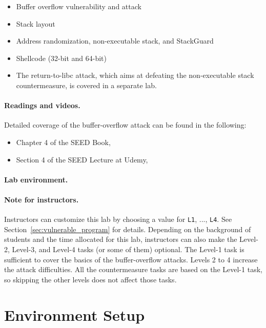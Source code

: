 \begin{itemize}[noitemsep]
\item Buffer overflow vulnerability and attack
\item Stack layout 
\item Address randomization, non-executable stack, and StackGuard
\item Shellcode (32-bit and 64-bit)
\item The return-to-libc attack, which aims at 
defeating the non-executable stack countermeasure, is covered 
in a separate lab.
\end{itemize}


\paragraph{Readings and videos.}
Detailed coverage of the buffer-overflow attack can be found in the following:

\begin{itemize}
\item Chapter 4 of the SEED Book, \seedbook
\item Section 4 of the SEED Lecture at Udemy, \seedcsvideo
\end{itemize}


\paragraph{Lab environment.} 
\seedenvironmentC


\paragraph{Note for instructors.} 
Instructors can customize this lab by choosing a value
for \texttt{L1}, ..., \texttt{L4}. See    
Section~\ref{sec:vulnerable_program} for details.
Depending on the background of students and the time allocated 
for this lab, instructors can also make the 
Level-2, Level-3, and Level-4 tasks (or some of them) optional. 
The Level-1 task is sufficient to cover the basics of 
the buffer-overflow attacks. Levels 2 to 4
increase the attack difficulties. 
All the countermeasure tasks are based on the Level-1 task, 
so skipping the other levels does not affect those tasks. 


\section{Environment Setup}

